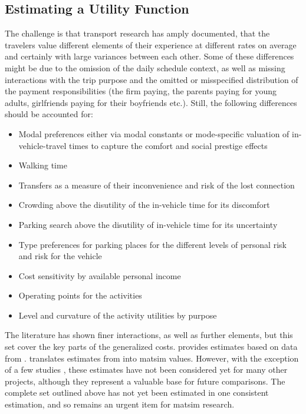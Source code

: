\subsection{Estimating a Utility Function}
\label{sec:estimation}
The challenge is that transport research has amply documented, that the travelers value different elements of their experience at different rates on average and certainly with large variances between each other. 
Some of these differences might be due to the omission of the daily schedule context, as well as missing interactions with the trip purpose and the omitted or misspecified distribution of the payment responsibilities (the firm paying, the parents paying for young adults, girlfriends paying for their boyfriends etc.). 
Still, the following differences should be accounted for: 
%
\begin{itemize}\styleItemize
\item Modal preferences either via modal constants or mode-specific valuation of in-vehicle-travel times to capture the comfort and social prestige effects
\item Walking time 
\item Transfers as a measure of their inconvenience and risk of the lost connection
\item Crowding above the disutility of the in-vehicle time for its discomfort
\item Parking search above the disutility of in-vehicle time for its uncertainty
\item Type preferences for parking places for the different levels of personal risk and risk for the vehicle
\item Cost sensitivity by available personal income 
\item Operating points for the activities
\item Level and curvature of the activity utilities by purpose
\end{itemize}

The literature has shown finer interactions, as well as further elements, but this set cover the key parts of the generalized costs. 
\citet[][]{Kickhoefer_MastersThesis_2009} provides estimates based on data from \citet[][]{VrticEtc2008ReisekostenSVIBericht}. 
\citet[][]{KickhoeferEtAl2012WelfareBusCorridorKuhmoNectar} translates estimates from \citet[][]{TirachiniEtAl2012CrowdingCongestion} into \gls{matsim} values. 
However, with the exception of a few studies \citep[][]{BalmerEtAl_ResRep_datapuls_2010, HuelsmannEtAl2012HotspotPricing, KickhoeferNagel2013EmissionInternalizationNETS, KaddouraEtAl2015PtMarginalSocialCostPricingJTEP}, these estimates have not been considered yet for many other projects, although they represent a valuable base for future comparisons. 
The complete set outlined above has not yet been estimated in one consistent estimation, and so remains an urgent item for \gls{matsim} research. 

